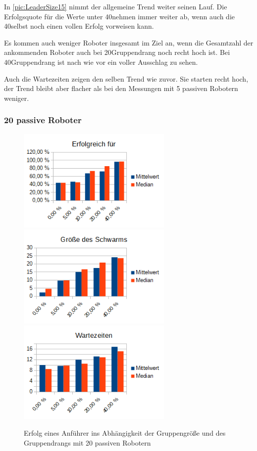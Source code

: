 In \autoref{pic:LeaderSize15} nimmt der allgemeine Trend weiter seinen Lauf. Die Erfolgsquote für die Werte unter 40\per nehmen immer weiter ab, wenn auch die 40\per selbst noch einen vollen Erfolg vorweisen kann.

Es kommen auch weniger Roboter insgesamt im Ziel an, wenn die Gesamtzahl der ankommenden Roboter auch bei 20\per Gruppendrang noch recht hoch ist. Bei 40\per Gruppendrang ist nach wie vor ein voller Ausschlag zu sehen.

Auch die Wartezeiten zeigen den selben Trend wie zuvor. Sie starten recht hoch, der Trend bleibt aber flacher als bei den Messungen mit 5 passiven Robotern weniger.

\subsubsection*{20 passive Roboter}

\begin{figure}[h]
	\includegraphics[width=7.5cm, keepaspectratio]{graphics/Statistics/Leader/FlockSize/20_1.png}
	\includegraphics[width=7.5cm, keepaspectratio]{graphics/Statistics/Leader/FlockSize/20_2.png}
	\includegraphics[width=7.5cm, keepaspectratio]{graphics/Statistics/Leader/FlockSize/20_3.png}
	\caption{Erfolg eines Anführer ins Abhängigkeit der Gruppengröße und des Gruppendrangs mit 20 passiven Robotern}
	\label{pic:LeaderSize20}
\end{figure}

